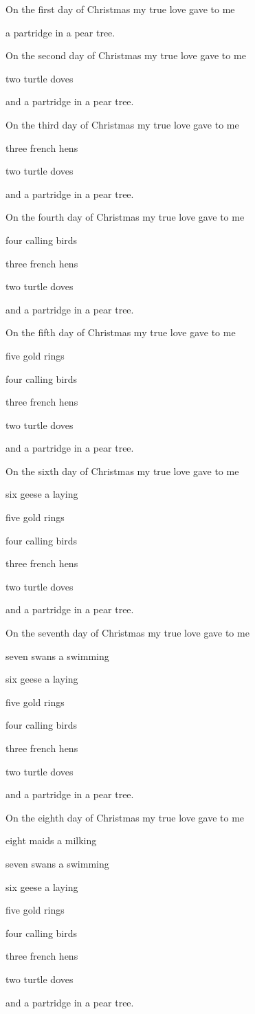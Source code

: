 \bigskip On the first day of Christmas my true love gave to me
\par a partridge in a pear tree.

\bigskip On the second day of Christmas my true love gave to me
\par two turtle doves
\par and a partridge in a pear tree.

\bigskip On the third day of Christmas my true love gave to me
\par three french hens
\par two turtle doves
\par and a partridge in a pear tree.

\bigskip On the fourth day of Christmas my true love gave to me
\par four calling birds
\par three french hens
\par two turtle doves
\par and a partridge in a pear tree.

\bigskip On the fifth day of Christmas my true love gave to me
\par five gold rings
\par four calling birds
\par three french hens
\par two turtle doves
\par and a partridge in a pear tree.

\bigskip On the sixth day of Christmas my true love gave to me
\par six geese a laying
\par five gold rings
\par four calling birds
\par three french hens
\par two turtle doves
\par and a partridge in a pear tree.

\bigskip On the seventh day of Christmas my true love gave to me
\par seven swans a swimming
\par six geese a laying
\par five gold rings
\par four calling birds
\par three french hens
\par two turtle doves
\par and a partridge in a pear tree.

\bigskip On the eighth day of Christmas my true love gave to me
\par eight maids a milking
\par seven swans a swimming
\par six geese a laying
\par five gold rings
\par four calling birds
\par three french hens
\par two turtle doves
\par and a partridge in a pear tree.

